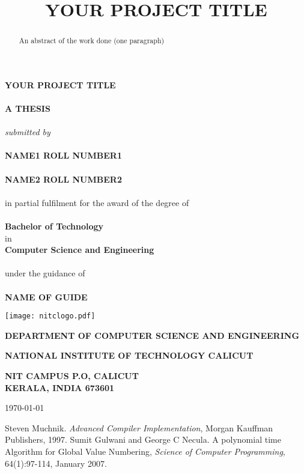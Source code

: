 \documentclass[12pt,a4paper]{report}
\begin{document}
\title{YOUR PROJECT TITLE }
\thispagestyle{empty}
\begin{center}
\textbf{{\large YOUR PROJECT TITLE}}\\
\ \\
\textbf{A THESIS} \\
\ \\
\emph{submitted by} \\
\ \\
\uppercase{\textbf{Name1 \hspace{0.25 in} Roll Number1}}\\
\ \\\uppercase{\textbf{Name2 \hspace{0.25 in}  Roll Number2}}\\
\ \\in partial fulfilment for the award of the degree of \\
\ \\ \textbf{Bachelor of Technology} \\ in \\ \textbf{Computer Science and Engineering}\\
\ \\under the guidance of \\ 
\ \\
\textbf{{\uppercase{NAME OF GUIDE}}}\\
\vspace*{1 in}
\begin{center}
\texttt{[image: nitclogo.pdf]}
\end{center}

\textbf{{\large DEPARTMENT OF COMPUTER SCIENCE AND ENGINEERING}}

\textbf{{\large NATIONAL INSTITUTE OF TECHNOLOGY CALICUT}}

\textbf{{\large NIT CAMPUS P.O, CALICUT\\KERALA, INDIA 673601}}

{\today}\\
\end{center}
\begin{abstract}
An abstract of the work done (one paragraph)
\end{abstract}
\tableofcontents
\listoffigures
\listoftables

\newpage
{} 








\begin{thebibliography}{}
Steven Muchnik. \textit{Advanced Compiler Implementation}, Morgan Kauffman Publishers, 1997.
Sumit Gulwani and George C Necula. A polynomial time Algorithm for Global Value Numbering, \textit{Science of Computer Programming}, 64(1):97-114, January 2007.
\end{thebibliography}{}
\end{document}
